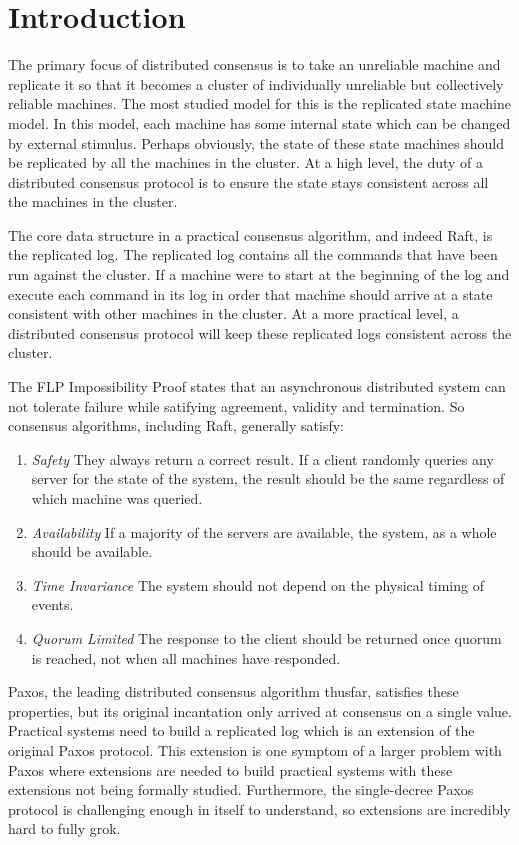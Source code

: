 \section{Introduction}

The primary focus of distributed consensus is to take an unreliable machine and replicate it so that it becomes a cluster of individually unreliable but collectively reliable machines.
The most studied model for this is the replicated state machine model.
In this model, each machine has some internal state which can be changed by external stimulus.
Perhaps obviously, the state of these state machines should be replicated by all the machines in the cluster.
At a high level, the duty of a distributed consensus protocol is to ensure the state stays consistent across all the machines in the cluster.

The core data structure in a practical consensus algorithm, and indeed Raft, is the replicated log.
The replicated log contains all the commands that have been run against the cluster.
If a machine were to start at the beginning of the log and execute each command in its log in order that machine should arrive at a state consistent with other machines in the cluster.
At a more practical level, a distributed consensus protocol will keep these replicated logs consistent across the cluster.

The FLP Impossibility Proof states that an asynchronous distributed system can not tolerate failure while satifying agreement, validity and termination. \cite{flp-theorem}
So consensus algorithms, including Raft, generally satisfy:
\begin{enumerate}
    \item \textit{Safety} They always return a correct result.
    If a client randomly queries any server for the state of the system, the result should be the same regardless of which machine was queried.
    \item \textit{Availability} If a majority of the servers are available, the system, as a whole should be available.
    \item \textit{Time Invariance} The system should not depend on the physical timing of events.
    \item \textit{Quorum Limited} The response to the client should be returned once quorum is reached, not when all machines have responded.
\end{enumerate}

Paxos, the leading distributed consensus algorithm thusfar, satisfies these properties, but its original incantation only arrived at consensus on a single value. \cite{long-form-paxos}
Practical systems need to build a replicated log which is an extension of the original Paxos protocol.
This extension is one symptom of a larger problem with Paxos where extensions are needed to build practical systems with these extensions not being formally studied.
Furthermore, the single-decree Paxos protocol is challenging enough in itself to understand, so extensions are incredibly hard to fully grok.

